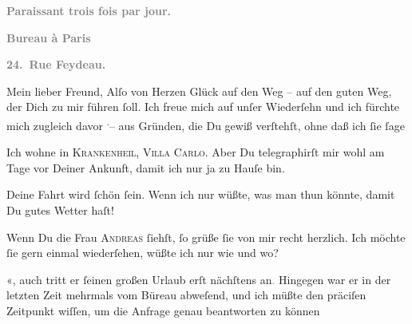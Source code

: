 \pstart
           \begin{otherlanguage}{french}\textcolor{gray}{\textbf{\textbf{Paraissant trois fois par jour.}}}\end{otherlanguage}\pend
           
\pstart
           \begin{otherlanguage}{french}\textcolor{gray}{\textbf{\textbf{Bureau à Paris}}}\end{otherlanguage}\pend
           
\pstart
           \begin{otherlanguage}{french}\textcolor{gray}{\textbf{\textbf{24. Rue Feydeau.}}}\end{otherlanguage}\pend
           
\pstart\center{}Mein lieber Freund,\pend\vspace{0.5em}
\pstart
           Alſo von Herzen Glück auf den Weg – auf den guten Weg, der Dich zu mir führen{ }ſoll.
               Ich freue mich auf unſer Wiederſehn und ich fürchte mich zugleich davor \substVorne{}\textsuperscript{.}\substDazwischen{}–\substHinten{} aus Gründen, die Du gewiß verſtehſt, ohne daß ich{ }ſie{ }ſage{\dotsfive}\pend
           
\pstart
           Ich wohne in \textsc{Krankenheil}, \textsc{Villa Carlo}. Aber Du telegraphirſt mir wohl am Tage vor Deiner Ankunft, {\pb}damit ich nur ja zu Hauſe bin.\pend
           
\pstart
           Deine Fahrt wird{ }ſchön{ }ſein. Wenn ich nur wüßte, was man thun könnte, damit Du gutes
               Wetter haſt!\pend
           
\pstart
           Wenn Du die Frau \textsc{Andreas}{ }ſiehſt,{ }ſo grüße{ }ſie von mir recht herzlich. Ich möchte{ }ſie gern einmal
               wiederſehen, wüßte ich nur wie und wo?\pend
           
\pstart
           \label{K_L02745-1v}\label{K_L02745-1}«, auch tritt er{ }ſeinen großen Urlaub erſt nächſtens an\textcolor{gray}{.}{ }{\pb}Hingegen war er in der letzten Zeit mehrmals vom
                  Büreau abweſend, und ich
               müßte den präciſen Zeitpunkt wiſſen, um die Anfrage  genau beantworten zu können{\dotssix}\pend
           
